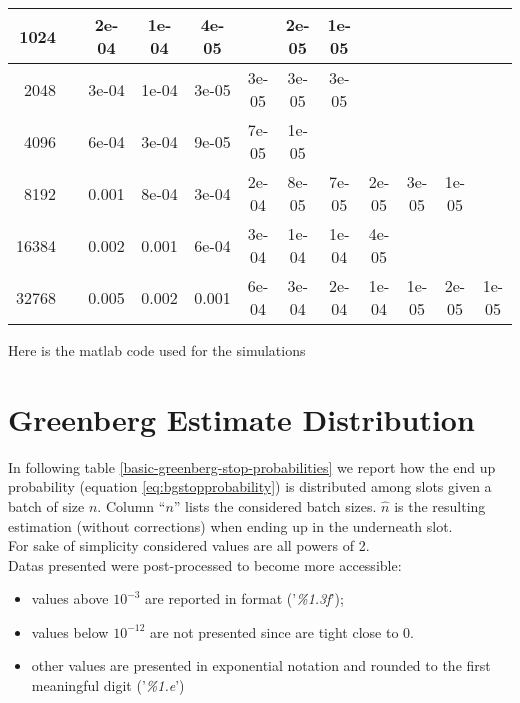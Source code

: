 \begin{appendices}
\begin{table}[H]
{\begin{tabular}{r|ccccccccccc}
1024 &&2e-04 &1e-04 &4e-05 &&2e-05 &1e-05 &&&&\\\hline

2048 &&3e-04 &1e-04 &3e-05 &3e-05 &3e-05 &3e-05 &&&&\\\hline

4096 &&6e-04 &3e-04 &9e-05 &7e-05 &1e-05 &&&&&\\\hline

8192 &&0.001 &8e-04 &3e-04 &2e-04 &8e-05 &7e-05 &2e-05 &3e-05 &1e-05 &\\\hline

16384 &&0.002 &0.001 &6e-04 &3e-04 &1e-04 &1e-04 &4e-05 &&&\\\hline

32768 &&0.005 &0.002 &0.001 &6e-04 &3e-04 &2e-04 &1e-04 &1e-05 &2e-05 &1e-05\\\hline

\end{tabular}
}
\end{table}

Here is the matlab code used for the simulations




%

\section{Greenberg Estimate Distribution}
In following table \ref{basic-greenberg-stop-probabilities} we report how the end  up probability (equation \ref{eq:bgstopprobability}) is distributed among slots given a batch of size $n$.  Column ``$n$'' lists  the considered batch sizes. $\hat{n}$ is the resulting estimation (without corrections) when ending up in the underneath slot.\\  For sake of simplicity considered values are all powers of 2.\\
Datas presented were post-processed to become more accessible:
\begin{itemize}
\item values above $10^{-3}$ are reported in format ('\emph{\%1.3f}');
\item values below $10^{-12}$ are not presented since are tight close to 0.
\item other values are presented in exponential notation and rounded to the first meaningful digit ('\emph{\%1.e}')
\end{itemize}



\end{appendices}
